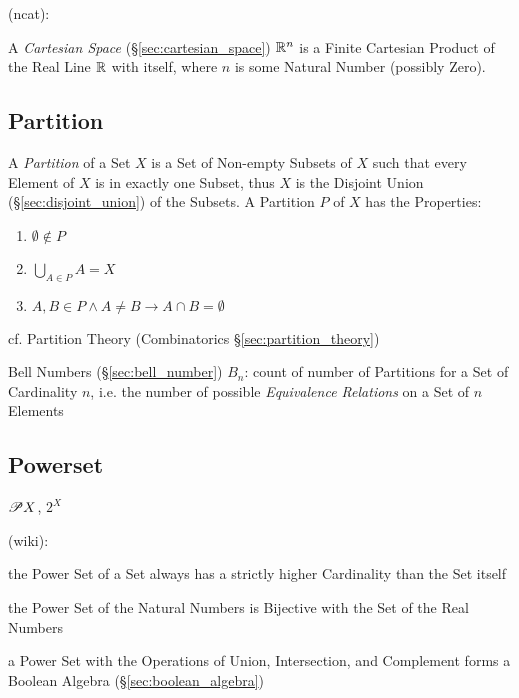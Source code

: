 (ncat):

A \emph{Cartesian Space} (\S\ref{sec:cartesian_space}) $\mathbb{R}^n$ is a Finite
Cartesian Product of the Real Line $\mathbb{R}$ with itself, where $n$ is some
Natural Number (possibly Zero).



\subsection{Partition}\label{sec:set_partition}

A \emph{Partition} of a Set $X$ is a Set of Non-empty Subsets of $X$ such that
every Element of $X$ is in exactly one Subset, thus $X$ is the Disjoint Union
(\S\ref{sec:disjoint_union}) of the Subsets. A Partition $P$ of $X$ has the
Properties:
\begin{enumerate}
  \item $\emptyset \notin P$
  \item $\bigcup_{A \in P}A = X$
  \item $A,B \in P \wedge A \neq B \to A \cap B = \emptyset$
\end{enumerate}

cf. Partition Theory (Combinatorics \S\ref{sec:partition_theory})

Bell Numbers (\S\ref{sec:bell_number}) $B_n$: count of number of Partitions for
a Set of Cardinality $n$, i.e. the number of possible \emph{Equivalence
Relations} on a Set of $n$ Elements



\subsection{Powerset}\label{sec:powerset}

$\mathscr{P}{X}$, $2^X$

(wiki):

the Power Set of a Set always has a strictly higher Cardinality than the Set
itself

the Power Set of the Natural Numbers is Bijective with the Set of the Real
Numbers

a Power Set with the Operations of Union, Intersection, and Complement forms a
Boolean Algebra (\S\ref{sec:boolean_algebra})


